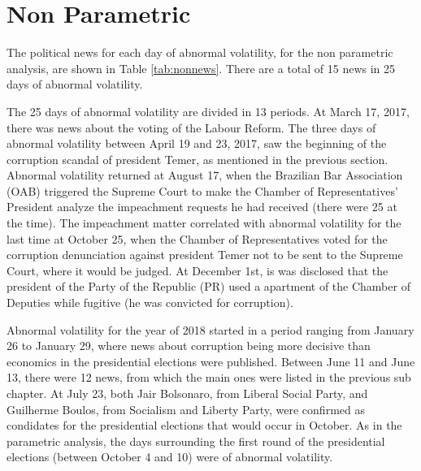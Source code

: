 \documentclass[cic,tc, english]{iiufrgs}
\begin{document}
\section{Non Parametric}

    The political news for each day of abnormal volatility, for the non parametric analysis, are shown in Table \ref{tab:nonnews}. There are a total of 15 news in 25 days of abnormal volatility.

    

    The 25 days of abnormal volatility are divided in 13 periods. At March 17, 2017, there was news about the voting of the Labour Reform. The three days of abnormal volatility between April 19 and 23, 2017, saw the beginning of the corruption scandal of president Temer, as mentioned in the previous section. Abnormal volatility returned at August 17, when the Brazilian Bar Association (OAB) triggered the Supreme Court to make the Chamber of Representatives' President analyze the impeachment requests he had received (there were 25 at the time). The impeachment matter correlated with abnormal volatility for the last time at October 25, when the Chamber of Representatives voted for the corruption denunciation against president Temer not to be sent to the Supreme Court, where it would be judged. At December 1st, is was disclosed that the president of the Party of the Republic (PR) used a apartment of the Chamber of Deputies while fugitive (he was convicted for corruption).

    Abnormal volatility for the year of 2018 started in a period ranging from January 26 to January 29, where news about corruption being more decisive than economics in the presidential elections were published. Between June 11 and June 13, there were 12 news, from which the main ones were listed in the previous sub chapter. At July 23, both Jair Bolsonaro, from Liberal Social Party, and Guilherme Boulos, from Socialism and Liberty Party, were confirmed as condidates for the presidential elections that would occur in October. As in the parametric analysis, the days surrounding the first round of the presidential elections (between October 4 and 10) were of abnormal volatility.
\end{document}
